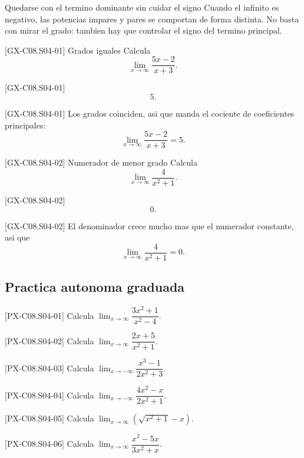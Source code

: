 \begin{commonerror}{Quedarse con el termino dominante sin cuidar el signo}
Cuando el infinito es negativo, las potencias impares y pares se comportan de forma distinta.
No basta con mirar el grado: tambien hay que controlar el signo del termino principal.
\end{commonerror}

\begin{guidedexercise}{[GX-C08.S04-01] Grados iguales}
Calcula
\[
\lim_{x\to\infty}\frac{5x-2}{x+3}.
\]
\end{guidedexercise}

\begin{shortanswer}{[GX-C08.S04-01]}
\[
5.
\]
\end{shortanswer}

\begin{fullsolution}{[GX-C08.S04-01]}
Los grados coinciden, asi que manda el cociente de coeficientes principales:
\[
\lim_{x\to\infty}\frac{5x-2}{x+3}=5.
\]
\end{fullsolution}

\begin{guidedexercise}{[GX-C08.S04-02] Numerador de menor grado}
Calcula
\[
\lim_{x\to\infty}\frac{4}{x^2+1}.
\]
\end{guidedexercise}

\begin{shortanswer}{[GX-C08.S04-02]}
\[
0.
\]
\end{shortanswer}

\begin{fullsolution}{[GX-C08.S04-02]}
El denominador crece mucho mas que el numerador constante, asi que
\[
\lim_{x\to\infty}\frac{4}{x^2+1}=0.
\]
\end{fullsolution}

\subsection*{Practica autonoma graduada}
\begin{exercise}{[PX-C08.S04-01] Calcula \(\lim_{x\to\infty}\dfrac{3x^2+1}{x^2-4}\).}
\end{exercise}
\begin{exercise}{[PX-C08.S04-02] Calcula \(\lim_{x\to\infty}\dfrac{2x+5}{x^2+1}\).}
\end{exercise}
\begin{exercise}{[PX-C08.S04-03] Calcula \(\lim_{x\to-\infty}\dfrac{x^3-1}{2x^2+3}\).}
\end{exercise}
\begin{exercise}{[PX-C08.S04-04] Calcula \(\lim_{x\to-\infty}\dfrac{4x^2-x}{2x^2+1}\).}
\end{exercise}
\begin{exercise}{[PX-C08.S04-05] Calcula \(\lim_{x\to\infty}(\sqrt{x^2+1}-x)\).}
\end{exercise}
\begin{exercise}{[PX-C08.S04-06] Calcula \(\lim_{x\to\infty}\dfrac{x^2-5x}{3x^2+x}\).}
\end{exercise}

